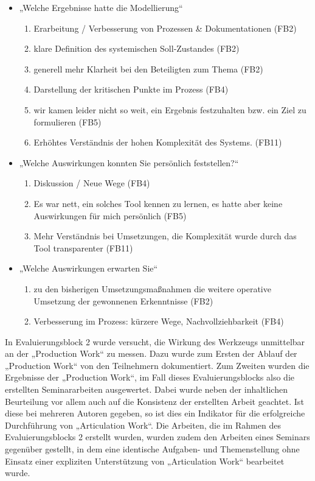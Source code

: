 \begin{itemize}
	\item „Welche Ergebnisse hatte die Modellierung“ \\
		\begin{enumerate}
			\item Erarbeitung / Verbesserung von Prozessen \& Dokumentationen (FB2)
			\item klare Definition des systemischen Soll‐Zustandes (FB2)
			\item generell mehr Klarheit bei den Beteiligten zum Thema (FB2)
			\item Darstellung der kritischen Punkte im Prozess (FB4)
			\item wir kamen leider nicht so weit, ein Ergebnis festzuhalten bzw. ein Ziel zu formulieren (FB5)
			\item Erhöhtes Verständnis der hohen Komplexität des Systems. (FB11) 
		\end{enumerate}
	\item „Welche Auswirkungen konnten Sie persönlich feststellen?“ \\
		\begin{enumerate}
			\item Diskussion / Neue Wege (FB4)
			\item Es war nett, ein solches Tool kennen zu lernen, es hatte aber keine Auswirkungen für mich persönlich (FB5)
			\item Mehr Verständnis bei Umsetzungen, die Komplexität wurde durch das Tool transparenter (FB11) 
		\end{enumerate}
	\item „Welche Auswirkungen erwarten Sie“ \\
		\begin{enumerate}
			\item zu den bisherigen Umsetzungsmaßnahmen die weitere operative Umsetzung der gewonnenen Erkenntnisse (FB2)
			\item Verbesserung im Prozess: kürzere Wege, Nachvollziehbarkeit (FB4)
		\end{enumerate}
\end{itemize}

In Evaluierungsblock 2 wurde versucht, die Wirkung des Werkzeugs unmittelbar an der „Production Work“ zu messen. Dazu wurde zum Ersten der Ablauf der „Production Work“ von den Teilnehmern dokumentiert. Zum Zweiten wurden die Ergebnisse der „Production Work“, im Fall dieses Evaluierungsblocks also die erstellten Seminararbeiten ausgewertet. Dabei wurde neben der inhaltlichen Beurteilung vor allem auch auf die Konsistenz der erstellten Arbeit geachtet. Ist diese bei mehreren Autoren gegeben, so ist dies ein Indikator für die erfolgreiche Durchführung von „Articulation Work“. Die Arbeiten, die im Rahmen des Evaluierungsblocks 2 erstellt wurden, wurden zudem den Arbeiten eines Seminars gegenüber gestellt, in dem eine identische Aufgaben- und Themenstellung ohne Einsatz einer expliziten Unterstützung von „Articulation Work“ bearbeitet wurde.

